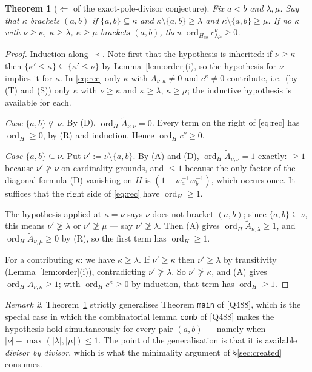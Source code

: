 \documentclass[11pt]{article}
\theoremstyle{plain}
\newtheorem{thm}{Theorem}
\theoremstyle{definition}
\theoremstyle{remark}
\newtheorem{rem}[thm]{Remark}
\theoremstyle{plain}
\newcommand{\At}{\widetilde{A}}
\newcommand{\ord}{\operatorname{ord}}
\begin{document}
\begin{thm}[$\Leftarrow$ of the exact-pole-divisor conjecture]\label{thm:easy}
Fix $a<b$ and $\lambda,\mu$.  Say that $\kappa$ \emph{brackets} $(a,b)$ if
$\{a,b\}\subseteq\kappa$ and $\kappa\setminus\{a,b\}\ge\lambda$ and
$\kappa\setminus\{a,b\}\ge\mu$.  If no $\kappa$ with $\nu\ge\kappa$,
$\kappa\ge\lambda$, $\kappa\ge\mu$ brackets $(a,b)$, then
$\ord_{H_{ab}}c^{\nu}_{\lambda\mu}\ge0$.
\end{thm}
\begin{proof}
Induction along $\prec$.  Note first that the hypothesis is inherited: if
$\nu\ge\kappa$ then $\{\kappa'\le\kappa\}\subseteq\{\kappa'\le\nu\}$ by
Lemma~\ref{lem:order}(i), so the hypothesis for $\nu$ implies it for $\kappa$.
In \eqref{eq:rec} only $\kappa$ with $\At_{\nu,\kappa}\ne0$ and
$c^{\kappa}\ne0$ contribute, i.e.\ (by (T) and (S)) only $\kappa$ with
$\nu\ge\kappa$ and $\kappa\ge\lambda$, $\kappa\ge\mu$; the inductive
hypothesis is available for each.

\emph{Case $\{a,b\}\not\subseteq\nu$.}  By (D), $\ord_H\At_{\nu,\nu}=0$.  Every
term on the right of \eqref{eq:rec} has $\ord_H\ge0$, by (R) and induction.
Hence $\ord_Hc^{\nu}\ge0$.

\emph{Case $\{a,b\}\subseteq\nu$.}  Put $\nu':=\nu\setminus\{a,b\}$.  By (A)
and (D), $\ord_H\At_{\nu,\nu}=1$ exactly: $\ge1$ because
$\nu'\not\ge\nu$ on cardinality grounds, and $\le1$ because the only factor of
the diagonal formula (D) vanishing on $H$ is $(1-w_a^{-1}w_b^{-1})$, which
occurs once.  It suffices that the right side of \eqref{eq:rec} have
$\ord_H\ge1$.

The hypothesis applied at $\kappa=\nu$ says $\nu$ does not bracket $(a,b)$;
since $\{a,b\}\subseteq\nu$, this means $\nu'\not\ge\lambda$ or
$\nu'\not\ge\mu$ --- say $\nu'\not\ge\lambda$.  Then (A) gives
$\ord_H\At_{\nu,\lambda}\ge1$, and $\ord_H\At_{\nu,\mu}\ge0$ by (R), so the
first term has $\ord_H\ge1$.

For a contributing $\kappa$: we have $\kappa\ge\lambda$.  If $\nu'\ge\kappa$
then $\nu'\ge\lambda$ by transitivity (Lemma~\ref{lem:order}(i)), contradicting
$\nu'\not\ge\lambda$.  So $\nu'\not\ge\kappa$, and (A) gives
$\ord_H\At_{\nu,\kappa}\ge1$; with $\ord_Hc^{\kappa}\ge0$ by induction, that
term has $\ord_H\ge1$.
\end{proof}

\begin{rem}
Theorem~\ref{thm:easy} strictly generalises Theorem \texttt{main} of [Q488],
which is the special case in which the combinatorial lemma
\texttt{comb} of [Q488] makes the hypothesis hold simultaneously for every pair
$(a,b)$ --- namely when $|\nu|-\max(|\lambda|,|\mu|)\le1$.  The point of the
generalisation is that it is available \emph{divisor by divisor}, which is what
the minimality argument of \S\ref{sec:created} consumes.
\end{rem}
\end{document}
